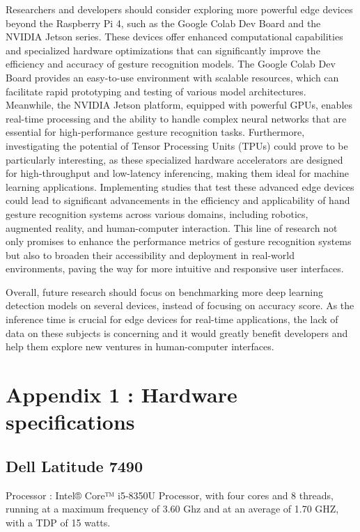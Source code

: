 \documentclass[12pt]{article}
\begin{document}
Researchers and developers should consider exploring more powerful edge devices beyond the Raspberry Pi 4, such as the Google Colab Dev Board and the NVIDIA Jetson series. These devices offer enhanced computational capabilities and specialized hardware optimizations that can significantly improve the efficiency and accuracy of gesture recognition models. The Google Colab Dev Board provides an easy-to-use environment with scalable resources, which can facilitate rapid prototyping and testing of various model architectures. Meanwhile, the NVIDIA Jetson platform, equipped with powerful GPUs, enables real-time processing and the ability to handle complex neural networks that are essential for high-performance gesture recognition tasks. Furthermore, investigating the potential of Tensor Processing Units (TPUs) could prove to be particularly interesting, as these specialized hardware accelerators are designed for high-throughput and low-latency inferencing, making them ideal for machine learning applications. Implementing studies that test these advanced edge devices could lead to significant advancements in the efficiency and applicability of hand gesture recognition systems across various domains, including robotics, augmented reality, and human-computer interaction. This line of research not only promises to enhance the performance metrics of gesture recognition systems but also to broaden their accessibility and deployment in real-world environments, paving the way for more intuitive and responsive user interfaces.

Overall, future research should focus on benchmarking more deep learning detection models on several devices, instead of focusing on accuracy score. As the inference time is crucial for edge devices for real-time applications, the lack of data on these subjects is concerning and it would greatly benefit developers and help them explore new ventures in human-computer interfaces.

\clearpage

\section{Appendix 1 : Hardware specifications}

\subsection{Dell Latitude 7490}

Processor : Intel® Core™ i5-8350U Processor, with four cores and 8 threads, running at a maximum frequency of 3.60 Ghz and at an average of 1.70 GHZ, with a TDP of 15 watts.
\end{document}
